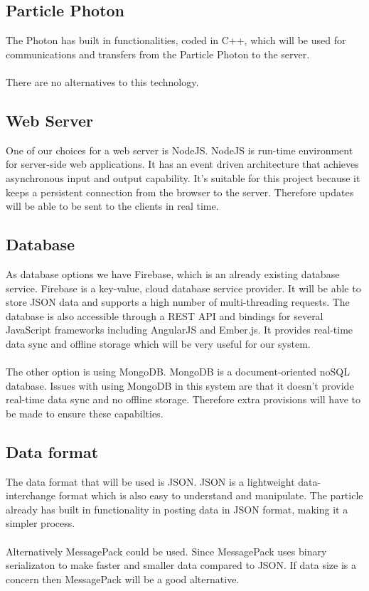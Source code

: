 \documentclass[paper=a4, fontsize=11pt]{scrartcl} %
\begin{document}
	\subsection{Particle Photon}
	The Photon has built in functionalities, coded in C++, which will be used for communications and transfers from the Particle Photon to the server.\\ 
	\\There are no alternatives to this technology.
	\subsection{Web Server}
	One of our choices for a web server is NodeJS. NodeJS is run-time environment for server-side web applications. It has an event driven
	architecture that achieves asynchronous input and output capability. It's suitable for this project because it keeps a persistent connection
	from the browser to the server. Therefore updates will be able to be sent to the clients in real time.
	\subsection{Database}
	As database options we have Firebase, which is an already existing database service. Firebase is a key-value, cloud database service provider. It will be
	able to store JSON data and supports a high number of multi-threading requests. The database is also accessible through a REST API and 
	bindings for several JavaScript frameworks including AngularJS and Ember.js. It provides real-time data sync and offline storage which will be
	very useful for our system.\\
	\\The other option is using MongoDB. MongoDB is a document-oriented noSQL database. Issues with using MongoDB in this system are that it
	doesn't provide real-time data sync and no offline storage. Therefore extra provisions will have to be made to ensure these capabilties.
	\subsection{Data format}
	The data format that will be used is JSON. JSON is a lightweight data-interchange format which is also easy to understand and
	manipulate. The particle already has built in functionality in posting data in JSON format, making it a simpler process.\\
	\\Alternatively MessagePack could be used. Since MessagePack uses binary serializaton to make faster and smaller data compared to JSON.
	If data size is a concern then MessagePack will be a good alternative.
\end{document}
